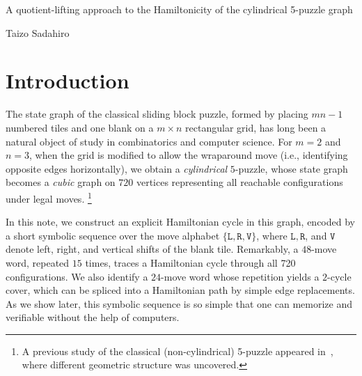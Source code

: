 \documentclass[lualatex,11pt]{article}
\begin{document}
\begin{center}
 {\large A quotient-lifting approach to the Hamiltonicity of the cylindrical 5-puzzle graph}

\bigskip
 Taizo Sadahiro
\end{center}

\begin{abstract}
In this short note, we construct an explicit Hamiltonian cycle in the state graph of the 5-puzzle on a cylindrical 
$2\times 3$ grid, a graph with $720$ vertices. 
The cycle is described by a short symbolic sequence of $48$ moves over the alphabet 
$\{{\mathtt L}, {\mathtt R}, {\mathtt V}\}$, repeated $15$ times, 
which can be verified directly. 
We also find a shorter 24-move sequence whose repetition yields a 2-cycle cover, 
which can be spliced into a Hamiltonian path. These constructions arise naturally 
from a general method: lifting Hamiltonian cycles from a quotient graph 
under the action of the puzzle’s symmetry group.
 The method produces compact, human-readable cycle encoding.

\end{abstract}

\section{Introduction}

The state graph of the classical sliding block puzzle, formed by 
placing $mn-1$ numbered tiles and one blank on a $m \times n$
rectangular grid, has long been a natural object of study 
in combinatorics and computer science. 
For $m=2$ and $n=3$, 
when the grid is modified to allow the wraparound move
(i.e., identifying opposite edges horizontally), 
we obtain a \emph{cylindrical} $5$-puzzle, whose state graph becomes 
a {\em cubic} graph on $720$ vertices representing all reachable 
configurations under legal moves. 
\footnote{A previous study of the classical (non-cylindrical) 5-puzzle 
appeared in~\cite{hanaokasadahiro23}, where different geometric structure
was uncovered.}


In this note, we construct an explicit Hamiltonian cycle 
in this graph, 
encoded by a short symbolic sequence over the move 
alphabet $\{{\mathtt L}, {\mathtt R}, {\mathtt V}\}$, 
where ${\mathtt L}, {\mathtt R}$, and ${\mathtt V}$ 
denote left, right, and vertical shifts of the blank tile. 
Remarkably, a $48$-move word, repeated $15$ times, 
traces a Hamiltonian cycle through all 720 configurations. 
We also identify a $24$-move word whose repetition yields a 
$2$-cycle cover, which can be spliced into a Hamiltonian path by 
simple edge replacements. 
As we show later, this symbolic sequence is so simple
that one can memorize and verifiable without the help
of computers. 
\end{document}
